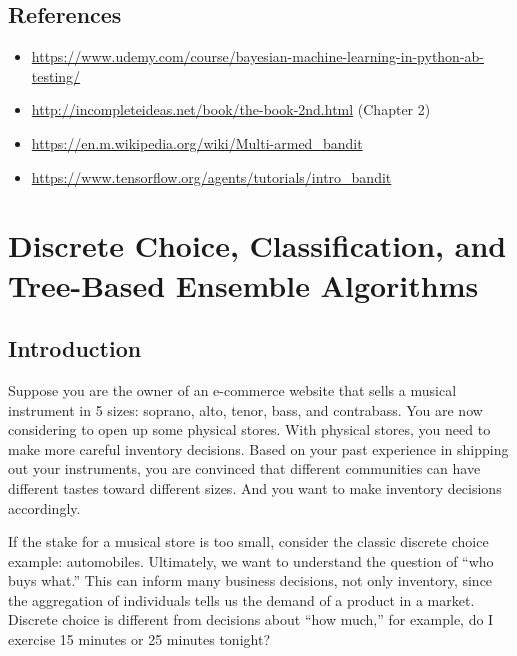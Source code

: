 \documentclass[
]{book}
\providecommand{\tightlist}{%
  \setlength{\itemsep}{0pt}\setlength{\parskip}{0pt}}
\theoremstyle{definition}
\theoremstyle{definition}
\theoremstyle{definition}
\theoremstyle{definition}
\theoremstyle{remark}
\begin{document}
\hypertarget{references}{%
\section{References}\label{references}}

\begin{itemize}
\tightlist
\item
  \url{https://www.udemy.com/course/bayesian-machine-learning-in-python-ab-testing/}
\item
  \url{http://incompleteideas.net/book/the-book-2nd.html} (Chapter 2)
\item
  \url{https://en.m.wikipedia.org/wiki/Multi-armed_bandit}
\item
  \url{https://www.tensorflow.org/agents/tutorials/intro_bandit}
\end{itemize}

\hypertarget{discrete-choice-classification-and-tree-based-ensemble-algorithms}{%
\chapter{Discrete Choice, Classification, and Tree-Based Ensemble Algorithms}\label{discrete-choice-classification-and-tree-based-ensemble-algorithms}}

\hypertarget{introduction-1}{%
\section{Introduction}\label{introduction-1}}

Suppose you are the owner of an e-commerce website that sells a musical instrument in 5 sizes: soprano, alto, tenor, bass, and contrabass. You are now considering to open up some physical stores. With physical stores, you need to make more careful inventory decisions. Based on your past experience in shipping out your instruments, you are convinced that different communities can have different tastes toward different sizes. And you want to make inventory decisions accordingly.

If the stake for a musical store is too small, consider the classic discrete choice example: automobiles. Ultimately, we want to understand the question of ``who buys what.'' This can inform many business decisions, not only inventory, since the aggregation of individuals tells us the demand of a product in a market. Discrete choice is different from decisions about ``how much,'' for example, do I exercise 15 minutes or 25 minutes tonight?
\end{document}
